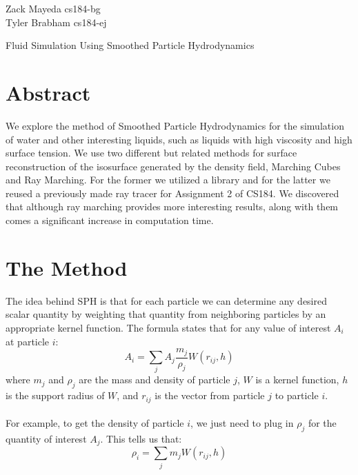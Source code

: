 \documentclass[11pt]{article}
\begin{document}
\begin{flushright}
Zack Mayeda cs184-bg \\
Tyler Brabham cs184-ej
\end{flushright}

\begin{center}
\LARGE
Fluid Simulation Using Smoothed Particle Hydrodynamics
\end{center}

\section*{Abstract}
We explore the method of Smoothed Particle Hydrodynamics for the simulation of water and other interesting liquids, such as liquids with high viscosity and high surface tension. We use two different but related methods for surface reconstruction of the 
isosurface generated by the density field, Marching Cubes and Ray Marching. For the former we utilized a library and for the latter we reused a previously made ray tracer for Assignment 2 of CS184.  We discovered that although ray marching provides more interesting results, along with them comes a significant increase in computation time.

\section*{The Method}
The idea behind SPH is that for each particle we can determine any desired scalar quantity by weighting that quantity from neighboring particles by an appropriate kernel function. The formula states that for any value of interest $A_i$ at particle $i$: $$A_i = \sum_{j} A_j \frac{m_j}{\rho_j}W(r_{ij},h)$$
where $m_j$ and $\rho_j$ are the mass and density of particle $j$, $W$ is a kernel function, $h$ is the support radius of $W$, and $r_{ij}$ is the vector from particle $j$ to particle $i$. 
\\ \\
For example, to get the density of particle $i$, we just need to plug in $\rho_j$ for the quantity of interest $A_j$. This tells us that: 
\\
$$\rho_i = \sum_{j} m_jW(r_{ij},h)$$
\end{document}
